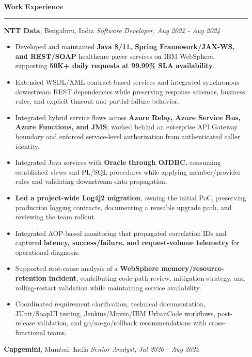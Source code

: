\documentclass[11pt,letterpaper]{article}
\newcommand{\ressection}[1]{\Needspace{6\baselineskip}\vspace{8pt}\par\textbf{#1}\par\vspace{2pt}\hrule\vspace{5pt}}
\begin{document}
\ressection{Work Experience}
\textbf{NTT Data}, Bengaluru, India \hfill \textit{Software Developer, Aug 2022 - Aug 2024}
\begin{itemize}
  \item Developed and maintained \textbf{Java 8/11, Spring Framework/JAX-WS, and REST/SOAP} healthcare payer services on IBM WebSphere, supporting \textbf{50K+ daily requests at 99.99\% SLA availability}.
  \item Extended WSDL/XML contract-based services and integrated synchronous downstream REST dependencies while preserving response schemas, business rules, and explicit timeout and partial-failure behavior.
  \item Integrated hybrid service flows across \textbf{Azure Relay, Azure Service Bus, Azure Functions, and JMS}; worked behind an enterprise API Gateway boundary and enforced service-level authorization from authenticated caller identity.
  \item Integrated Java services with \textbf{Oracle through OJDBC}, consuming established views and PL/SQL procedures while applying member/provider rules and validating downstream data propagation.
  \item \textbf{Led a project-wide Log4j2 migration}, owning the initial PoC, preserving production logging contracts, documenting a reusable upgrade path, and reviewing the team rollout.
  \item Integrated AOP-based monitoring that propagated correlation IDs and captured \textbf{latency, success/failure, and request-volume telemetry} for operational diagnosis.
  \item Supported root-cause analysis of a \textbf{WebSphere memory/resource-retention incident}, contributing code-path review, mitigation strategy, and rolling-restart validation while maintaining service availability.
  \item Coordinated requirement clarification, technical documentation, JUnit/SoapUI testing, Jenkins/Maven/IBM UrbanCode workflows, post-release validation, and go/no-go/rollback recommendations with cross-functional teams.
\end{itemize}
\textbf{Capgemini}, Mumbai, India \hfill \textit{Senior Analyst, Jul 2020 - Aug 2022}
\end{document}

